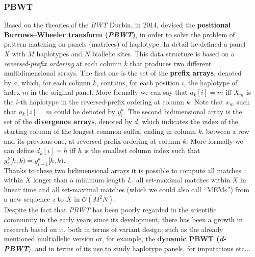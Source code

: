 \documentclass[a4paper,11pt, oneside]{article}
\begin{document}
\subsubsection*{PBWT}
Based on the theories of the \textit{BWT} Durbin, in 2014, devised the
\textbf{positional Burrows–Wheeler transform (\textit{PBWT})}, in order to
solve the problem of pattern matching on panels (matrices) of haplotype. In
detail he defined a panel $X$ with $M$ haplotypes and $N$ biallelic
sites. This data structure is based on a \textit{reversed-prefix ordering} at
each column 
$k$ that produces two different multidimensional arrays. The first one is the
set of the
\textbf{prefix arrays}, denoted by $a$, which, for each column $k$, contains, for 
each position $i$, the haplotype of index $m$ in the original panel. More
formally we can say that $a_k[i]=m$ iff $X_m$ is the $i$-th haplotype in the
reversed-prefix ordering at column $k$. Note that $x_m$ such that $a_k[i]=m$
could be denoted by $y_i^k$. The second bidimensional array is the set of the
\textbf{divergence arrays}, denoted by $d$, which indicates the index of the
starting column of the longest common suffix, ending in column $k$, between a
row and its previous one, at reversed-prefix ordering at column $k$. More
formally we can define $d_k[i]=h$ iff $h$ is the smallest column index such that
$y_i^k[h,k)=y_{i-1}^k[h,k)$. \\
Thanks to these two bidimensional arrays it is possible to compute all matches
within $X$ longer than a minimum length $L$, all set-maximal matches within $X$
in linear time and all set-maximal matches (which we could also call ``MEMs'')
from a new sequence $z$ to $X$ in $\mathcal{O}(M^2N)$.\\
Despite the fact that \textit{PBWT} has been poorly regarded in the scientific
community 
in the early years since its development, there has been a growth in research
based on it, both in terms of variant design, such as the already mentioned
multiallelic version or, for example, the \textbf{dynamic PBWT
  (\textit{d-PBWT}}), and in terms of its use to study haplotype panels, for
imputations etc$\ldots$
\end{document}

